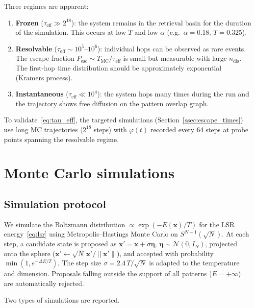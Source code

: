 \documentclass[11pt]{article}
\newcommand{\bx}{\mathbf{x}}
\begin{document}
Three regimes are apparent:
\begin{enumerate}
\item \textbf{Frozen} ($\tau_{\mathrm{eff}} \gg 2^{18}$): the system remains in the retrieval basin for the duration of the simulation.  This occurs at low $T$ and low $\alpha$ (e.g.\ $\alpha = 0.18$, $T = 0.325$).
\item \textbf{Resolvable} ($\tau_{\mathrm{eff}} \sim 10^5$--$10^6$): individual hops can be observed as rare events.  The escape fraction $P_{\mathrm{esc}} \sim T_{\mathrm{MC}}/\tau_{\mathrm{eff}}$ is small but measurable with large $n_{\mathrm{dis}}$.  The first-hop time distribution should be approximately exponential (Kramers process).
\item \textbf{Instantaneous} ($\tau_{\mathrm{eff}} \ll 10^4$): the system hops many times during the run and the trajectory shows free diffusion on the pattern overlap graph.
\end{enumerate}

To validate~\eqref{eq:tau_eff}, the targeted simulations (Section~\ref{ssec:escape_times}) use long MC trajectories ($2^{18}$ steps) with $\varphi(t)$ recorded every 64 steps at probe points spanning the resolvable regime.

\section{Monte Carlo simulations}
\label{sec:mc}

\subsection{Simulation protocol}
\label{ssec:protocol}

We simulate the Boltzmann distribution $\propto \exp(-E(\bx)/T)$ for the LSR energy~\eqref{eq:lsr} using Metropolis--Hastings Monte Carlo on $S^{N-1}(\!\sqrt{N})$.  At each step, a candidate state is proposed as $\bx' = \bx + \sigma\boldsymbol{\eta}$, $\boldsymbol{\eta} \sim \mathcal{N}(0, I_N)$, projected onto the sphere ($\bx' \leftarrow \sqrt{N}\,\bx'/\|\bx'\|$), and accepted with probability $\min(1, e^{-\Delta E/T})$.  The step size $\sigma = 2.4\,T/\sqrt{N}$ is adapted to the temperature and dimension.  Proposals falling outside the support of all patterns ($E = +\infty$) are automatically rejected.

Two types of simulations are reported.
\end{document}
